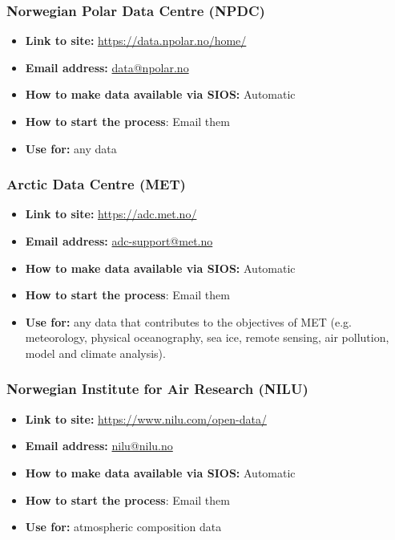 \documentclass[a4paper,12pt]{article}
\begin{document}
\subsubsection{Norwegian Polar Data Centre (NPDC)}
\begin{itemize}
    \item \textbf{Link to site:} \url{https://data.npolar.no/home/}
    \item \textbf{Email address:} \href{mailto:data@npolar.no}{data@npolar.no}
    \item \textbf{How to make data available via SIOS:} Automatic
    \item \textbf{How to start the process}: Email them
    \item \textbf{Use for: } any data
\end{itemize}

\subsubsection{Arctic Data Centre (MET)}
\begin{itemize}
    \item \textbf{Link to site:} \url{https://adc.met.no/}
    \item \textbf{Email address:} \href{mailto:adc-support@met.no}{adc-support@met.no}
    \item \textbf{How to make data available via SIOS:} Automatic
    \item \textbf{How to start the process}: Email them
    \item \textbf{Use for: } any data that contributes to the objectives of MET (e.g. meteorology, physical oceanography, sea ice, remote sensing, air pollution, model and climate analysis).
\end{itemize}

\subsubsection{Norwegian Institute for Air Research (NILU)}
\begin{itemize}
    \item \textbf{Link to site:} \url{https://www.nilu.com/open-data/}
    \item \textbf{Email address:} \href{mailto:nilu@nilu.no}{nilu@nilu.no}
    \item \textbf{How to make data available via SIOS:} Automatic
    \item \textbf{How to start the process}: Email them
    \item \textbf{Use for: } atmospheric composition data
\end{itemize}
\end{document}
